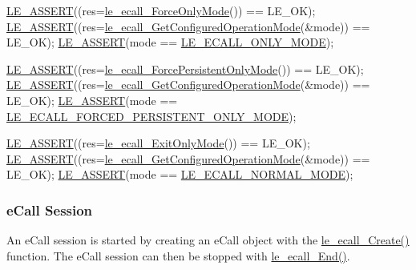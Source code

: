 \begin{DoxyCodeInclude}
    \hyperlink{le__log_8h_ac0dbbef91dc0fed449d0092ff0557b39}{LE\_ASSERT}((res=\hyperlink{le__ecall__interface_8h_a042d52c84b5b679ab32dd814c5b0be9e}{le\_ecall\_ForceOnlyMode}()) == LE\_OK);
    \hyperlink{le__log_8h_ac0dbbef91dc0fed449d0092ff0557b39}{LE\_ASSERT}((res=\hyperlink{le__ecall__interface_8h_a8e245065491b14f46405e415ea17b6b8}{le\_ecall\_GetConfiguredOperationMode}(&mode)) 
      == LE\_OK);
    \hyperlink{le__log_8h_ac0dbbef91dc0fed449d0092ff0557b39}{LE\_ASSERT}(mode == \hyperlink{le__ecall__interface_8h_af762f89b222e4cc18e9646c6e4b945b9a841847f485e780277e11d1e942d8800d}{LE\_ECALL\_ONLY\_MODE});

    \hyperlink{le__log_8h_ac0dbbef91dc0fed449d0092ff0557b39}{LE\_ASSERT}((res=\hyperlink{le__ecall__interface_8h_ad468828b0024de378d91ea9c30fd6f3f}{le\_ecall\_ForcePersistentOnlyMode}()) == LE\_OK);
    \hyperlink{le__log_8h_ac0dbbef91dc0fed449d0092ff0557b39}{LE\_ASSERT}((res=\hyperlink{le__ecall__interface_8h_a8e245065491b14f46405e415ea17b6b8}{le\_ecall\_GetConfiguredOperationMode}(&mode)) 
      == LE\_OK);
    \hyperlink{le__log_8h_ac0dbbef91dc0fed449d0092ff0557b39}{LE\_ASSERT}(mode == \hyperlink{le__ecall__interface_8h_af762f89b222e4cc18e9646c6e4b945b9a6d328d963d60c73e04af260f8dae7257}{LE\_ECALL\_FORCED\_PERSISTENT\_ONLY\_MODE});

    \hyperlink{le__log_8h_ac0dbbef91dc0fed449d0092ff0557b39}{LE\_ASSERT}((res=\hyperlink{le__ecall__interface_8h_a924114fa7fab10c3f351766a76134f34}{le\_ecall\_ExitOnlyMode}()) == LE\_OK);
    \hyperlink{le__log_8h_ac0dbbef91dc0fed449d0092ff0557b39}{LE\_ASSERT}((res=\hyperlink{le__ecall__interface_8h_a8e245065491b14f46405e415ea17b6b8}{le\_ecall\_GetConfiguredOperationMode}(&mode)) 
      == LE\_OK);
    \hyperlink{le__log_8h_ac0dbbef91dc0fed449d0092ff0557b39}{LE\_ASSERT}(mode == \hyperlink{le__ecall__interface_8h_af762f89b222e4cc18e9646c6e4b945b9a9d8e54c64e4796257880e146b15521f5}{LE\_ECALL\_NORMAL\_MODE});
\end{DoxyCodeInclude}
 \hypertarget{c_SDD_eCall_le_ecall_session}{}\subsubsection{e\+Call Session}\label{c_SDD_eCall_le_ecall_session}
An e\+Call session is started by creating an e\+Call object with the \hyperlink{le__ecall__interface_8h_aad7fa3b34d9d72a2f1d4baa681ba25cc}{le\+\_\+ecall\+\_\+\+Create()} function. The e\+Call session can then be stopped with \hyperlink{le__ecall__interface_8h_a85800c86f9709fb7baa7219cc762181c}{le\+\_\+ecall\+\_\+\+End()}.

